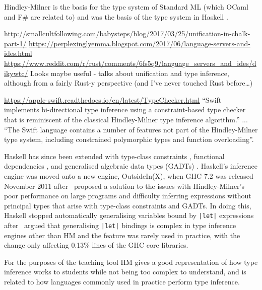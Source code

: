 \documentclass[a4paper,fleqn,12pt]{article}
\begin{document}
Hindley-Milner is the basis for the type system of Standard ML \citep{ref14} (which OCaml and F\# are related to) and was the basis of the type system in Haskell \citep{ref15}.

\underline{\href{http://smallcultfollowing.com/babysteps/blog/2017/03/25/unification-in-chalk-part-1/}{http://smallcultfollowing.com/babysteps/blog/2017/03/25/unification-in-chalk-part-1/}}
\underline{\href{https://perplexinglyemma.blogspot.com/2017/06/language-servers-and-ides.html}{https://perplexinglyemma.blogspot.com/2017/06/language-servers-and-ides.html}}
\underline{\href{https://www.reddit.com/r/rust/comments/6fs5q9/language\_servers\_and\_ides/dikywtc/}{https://www.reddit.com/r/rust/comments/6fs5q9/language\_servers\_and\_ides/dikywtc/}}
Looks maybe useful - talks about unification and type inference, although from a fairly Rust-y perspective (and I’ve never touched Rust before…)

\underline{\href{https://apple-swift.readthedocs.io/en/latest/TypeChecker.html}{https://apple-swift.readthedocs.io/en/latest/TypeChecker.html}}
“Swift implements bi-directional type inference using a constraint-based type checker that is reminiscent of the classical Hindley-Milner type inference algorithm.” ... “The Swift language contains a number of features not part of the Hindley-Milner type system, including constrained polymorphic types and function overloading”.

Haskell has since been extended with type-class constraints \citep{ref16}, functional dependencies \citep{ref17}, and generalised algebraic data types (GADTs) \citep{ref18}. Haskell’s inference engine was moved onto a new engine, OutsideIn(X), when GHC 7.2 was released November 2011 after~\cite{ref19} proposed a solution to the issues with Hindley-Milner’s poor performance on large programs and difficulty inferring expressions without principal types that arise with type-class constraints and GADTs. In doing this, Haskell stopped automatically generalising variables bound by \texttt{|let|} expressions after~\cite{ref20} argued that generalising \texttt{|let|} bindings is complex in type inference engines other than HM and the feature was rarely used in practice, with the change only affecting 0.13\% lines of the GHC core libraries.

For the purposes of the teaching tool HM gives a good representation of how type inference works to students while not being too complex to understand, and is related to how languages commonly used in practice perform type inference.
\end{document}
